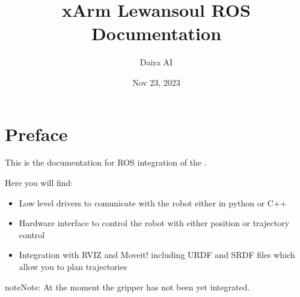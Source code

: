 \documentclass[letterpaper,10pt,english]{sphinxmanual}
\title{xArm Lewansoul ROS Documentation}
\date{Nov 23, 2023}
\author{Daira AI}
\begin{document}
\pagestyle{empty}

    \begin{titlepage}

    

    \makecover

    \end{titlepage}
    \clearpage
    \tableofcontents
    \clearpage
    
\pagestyle{plain}
 
\pagestyle{normal}
\label{\detokenize{index::doc}}



\chapter{Preface}
\label{\detokenize{index:preface}}
\sphinxAtStartPar
This is the documentation for ROS integration of the .

\begin{figure}[htbp]
\centering

\noindent{}
\end{figure}

\sphinxAtStartPar
Here you will find:
\begin{itemize}
\item {} 
\sphinxAtStartPar
Low level drivers to comunicate with the robot either in python or C++

\item {} 
\sphinxAtStartPar
Hardware interface to control the robot with either position or trajectory control

\item {} 
\sphinxAtStartPar
Integration with RVIZ and Moveit! including URDF and SRDF files which allow you to plan trajectories

\end{itemize}

\begin{sphinxadmonition}{note}{Note:}
\sphinxAtStartPar
At the moment the gripper has not been yet integrated.
\end{sphinxadmonition}
\end{document}

